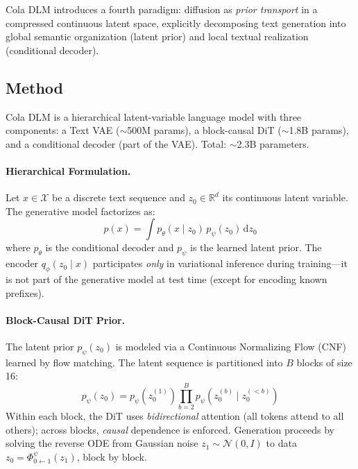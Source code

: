 \documentclass[11pt]{article}
\begin{document}
Cola DLM introduces a fourth paradigm: diffusion as \emph{prior transport} in a compressed continuous latent space, explicitly decomposing text generation into global semantic organization (latent prior) and local textual realization (conditional decoder).

\subsection{Method}

Cola DLM is a hierarchical latent-variable language model with three components: a Text VAE ($\sim$500M params), a block-causal DiT ($\sim$1.8B params), and a conditional decoder (part of the VAE). Total: $\sim$2.3B parameters.

\paragraph{Hierarchical Formulation.}
Let $x \in \mathcal{X}$ be a discrete text sequence and $z_0 \in \mathbb{R}^d$ its continuous latent variable. The generative model factorizes as:
\begin{equation}
    p(x) = \int p_\theta(x \mid z_0)\, p_\psi(z_0)\, \mathrm{d}z_0
\end{equation}
where $p_\theta$ is the conditional decoder and $p_\psi$ is the learned latent prior. The encoder $q_\phi(z_0 \mid x)$ participates \emph{only} in variational inference during training---it is not part of the generative model at test time (except for encoding known prefixes).

\paragraph{Block-Causal DiT Prior.}
The latent prior $p_\psi(z_0)$ is modeled via a Continuous Normalizing Flow (CNF) learned by flow matching. The latent sequence is partitioned into $B$ blocks of size 16:
\begin{equation}
    p_\psi(z_0) = p_\psi(z_0^{(1)}) \prod_{b=2}^{B} p_\psi(z_0^{(b)} \mid z_0^{(<b)})
\end{equation}
Within each block, the DiT uses \emph{bidirectional} attention (all tokens attend to all others); across blocks, \emph{causal} dependence is enforced. Generation proceeds by solving the reverse ODE from Gaussian noise $z_1 \sim \mathcal{N}(0, I)$ to data $z_0 = \Phi_{0 \leftarrow 1}^\psi(z_1)$, block by block.
\end{document}
